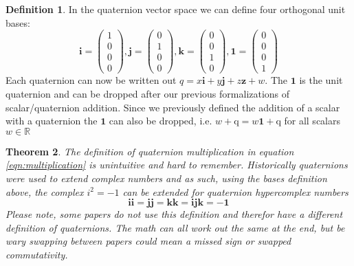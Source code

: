 \documentclass{amsart}
\newtheorem{theorem}{Theorem}[section]
\theoremstyle{definition}
\newtheorem{definition}[theorem]{Definition}
\theoremstyle{remark}
\numberwithin{equation}{section}
\begin{document}
\begin{definition}
  In the quaternion vector space we can define four orthogonal unit bases:
  \begin{equation}
    \mathbf{i} =
    \begin{pmatrix}
      1 \\
      0 \\
      0 \\
      0
    \end{pmatrix},
    \mathbf{j} =
    \begin{pmatrix}
      0 \\
      1 \\
      0 \\
      0
    \end{pmatrix}, 
    \mathbf{k} =
    \begin{pmatrix}
      0 \\
      0 \\
      1 \\
      0
    \end{pmatrix}, 
    \mathbf{1} =
    \begin{pmatrix}
      0 \\
      0 \\
      0 \\
      1
    \end{pmatrix}
  \end{equation}
  Each quaternion can now be written out $q = x \mathbf{i} + y \mathbf{j} + z \mathbf{z} + w$. The $\mathbf{1}$ is the unit quaternion and can be dropped after our previous formalizations of scalar/quaternion addition. Since we previously defined the addition of a scalar with a quaternion the $\mathbf{1}$ can also be dropped, i.e. $w+\mathrm{q} = w\mathbf{1} +\mathrm{q}$ for all scalars $w\in\mathbb{R}$
\end{definition}

\begin{theorem}
  The definition of quaternion multiplication in equation \ref{eqn:multiplication} is unintuitive and hard to remember. Historically quaternions were used to extend complex numbers and as such, using the bases definition above, the complex $i^2=-1$ can be extended for quaternion hypercomplex numbers
  \begin{equation}
    \mathbf{ii} = \mathbf{jj} = \mathbf{kk} = \mathbf{ijk} = -\mathbf{1}
  \end{equation}
  Please note, some papers do not use this definition and therefor have a different definition of quaternions. The math can all work out the same at the end, but be wary swapping between papers could mean a missed sign or swapped commutativity.
\end{theorem}
\end{document}
